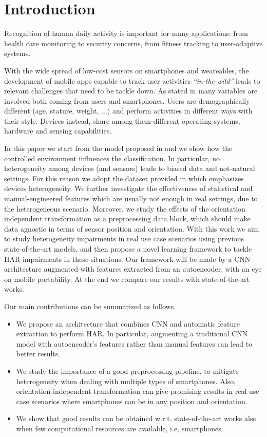 
\section{Introduction}
\label{sec:introduction}

Recognition of human daily activity is important for many
applications: from health care monitoring to security concerns, from
fitness tracking to user-adaptive systems.

With the wide spread of low-cost sensors on smartphones and
weareables, the development of mobile apps capable to track user
activities \textit{``in-the-wild''} leads to relevant challenges that
need to be tackle down. As stated in \cite{blunck2013heterogeneity}
many variables are involved both coming from users and
smartphones. Users are demographically different (age, stature,
weight, ...) and perform activities in different ways with their
style. Devices instead, share among them different operating-systems,
hardware and sensing capabilities.

In this paper we start from the model proposed in
\cite{ignatov2018real} and we show how the controlled environment
influences the classification.  In particular, no heterogeneity among
devices (and sensors) leads to biased data and not-natural settings.
For this reason we adopt the dataset provided in
\cite{stisen2015smart} which emphasizes devices heterogeneity.  We
further investigate the effectiveness of statistical and
manual-engineered features which are usually not enough in real
settings, due to the heterogeneous scenario. Moreover, we study the
effects of the orientation independent transformation as a
preprocessing data block, which should make data agnostic in terms of
sensor position and orientation.  With this work we aim to study
heterogeneity impairments in real use case scenarios using previous
state-of-the-art models, and then propose a novel learning framework
to tackle HAR impairments in these situations. Our framework will be made by a CNN
architecture augmented with features extracted from an autoencoder,
with an eye on mobile portability.  At the end we compare our results
with state-of-the-art works.

Our main contributions can be summarized as follows.

\begin{itemize}
  \item We propose an architecture that combines CNN and automatic
    feature extraction to perform HAR. In particular, augmenting a
    traditional CNN model with autoencoder's features rather than
    manual features can lead to better results.
  \item We study the importance of a good preprocessing pipeline, to
    mitigate heterogeneity when dealing with multiple types of
    smartphones. Also, orientation independent transformation can give
    promising results in real use case scenarios where smartphones can
    be in any position and orientation.
  \item We show that good results can be obtained
    w.r.t. state-of-the-art works also when few computational
    resources are available, i.e, smartphones.
\end{itemize}

